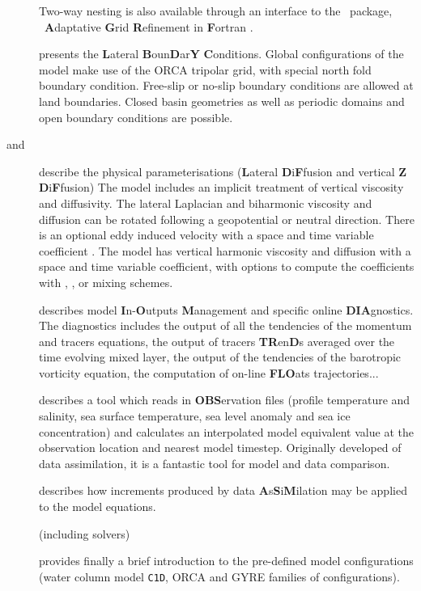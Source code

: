 \begin{description}
Two-way nesting is also available through an interface to the \AGRIF\ package,
\ie\ \textbf{A}daptative \textbf{G}rid \textbf{R}efinement in \textbf{F}ortran
\citep{debreu.vouland.ea_CG08}.
\item [\nameref{chap:LBC}] presents the \textbf{L}ateral
\textbf{B}oun\textbf{D}ar\textbf{Y} \textbf{C}onditions.
Global configurations of the model make use of the ORCA tripolar grid,
with special north fold boundary condition.
Free-slip or no-slip boundary conditions are allowed at land boundaries.
Closed basin geometries as well as periodic domains and open boundary conditions are possible.
\item [\nameref{chap:LDF} and \nameref{chap:ZDF}] describe the physical parameterisations
(\textbf{L}ateral \textbf{D}i\textbf{F}fusion and vertical \textbf{Z} \textbf{D}i\textbf{F}fusion)
The model includes an implicit treatment of vertical viscosity and diffusivity.
The lateral Laplacian and biharmonic viscosity and diffusion can be rotated following
a geopotential or neutral direction.
There is an optional eddy induced velocity \citep{gent.mcwilliams_JPO90} with
a space and time variable coefficient \citet{treguier.held.ea_JPO97}.
The model has vertical harmonic viscosity and diffusion with a space and time variable coefficient,
with options to compute the coefficients with \citet{blanke.delecluse_JPO93},
\citet{pacanowski.philander_JPO81}, or \citet{umlauf.burchard_JMR03} mixing schemes.
\item [\nameref{chap:DIA}] describes model \textbf{I}n-\textbf{O}utputs \textbf{M}anagement and
specific online \textbf{DIA}gnostics.
The diagnostics includes the output of all the tendencies of the momentum and tracers equations,
the output of tracers \textbf{TR}en\textbf{D}s averaged over the time evolving mixed layer,
the output of the tendencies of the barotropic vorticity equation,
the computation of on-line \textbf{FLO}ats trajectories...
\item [\nameref{chap:OBS}] describes a tool which reads in \textbf{OBS}ervation files
(profile temperature and salinity, sea surface temperature, sea level anomaly and
sea ice concentration) and calculates an interpolated model equivalent value at
the observation location and nearest model timestep.
Originally developed of data assimilation, it is a fantastic tool for model and data comparison.
\item [\nameref{chap:ASM}] describes how increments produced by
data \textbf{A}s\textbf{S}i\textbf{M}ilation may be applied to the model equations.
\item [\nameref{chap:STO}]
\item [\nameref{chap:MISC}] (including solvers)
\item [\nameref{chap:CFGS}] provides finally a brief introduction to
the pre-defined model configurations
(water column model \texttt{C1D}, ORCA and GYRE families of configurations).
\end{description}

